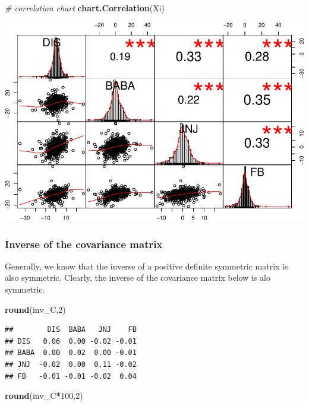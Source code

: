 \documentclass[]{article}
\newenvironment{Shaded}{\begin{snugshade}}{\end{snugshade}}
\newcommand{\KeywordTok}[1]{\textcolor[rgb]{0.13,0.29,0.53}{\textbf{#1}}}
\newcommand{\DecValTok}[1]{\textcolor[rgb]{0.00,0.00,0.81}{#1}}
\newcommand{\CommentTok}[1]{\textcolor[rgb]{0.56,0.35,0.01}{\textit{#1}}}
\newcommand{\OperatorTok}[1]{\textcolor[rgb]{0.81,0.36,0.00}{\textbf{#1}}}
\newcommand{\NormalTok}[1]{#1}
\begin{document}
\begin{Shaded}
\begin{Highlighting}[]
\CommentTok{# correlation chart}
\KeywordTok{chart.Correlation}\NormalTok{(Xi)}
\end{Highlighting}
\end{Shaded}

\includegraphics{Markowitz_Research_Me_files/figure-latex/unnamed-chunk-13-2.pdf}

\subsubsection{Inverse of the covariance
matrix}\label{inverse-of-the-covariance-matrix}

Generally, we know that the inverse of a positive definite symmetric
matrix is also symmetric. Clearly, the inverse of the covariance matrix
below is alo symmetric.

\begin{Shaded}
\begin{Highlighting}[]
\KeywordTok{round}\NormalTok{(inv_C,}\DecValTok{2}\NormalTok{)}
\end{Highlighting}
\end{Shaded}

\begin{verbatim}
##        DIS  BABA   JNJ    FB
## DIS   0.06  0.00 -0.02 -0.01
## BABA  0.00  0.02  0.00 -0.01
## JNJ  -0.02  0.00  0.11 -0.02
## FB   -0.01 -0.01 -0.02  0.04
\end{verbatim}

\begin{Shaded}
\begin{Highlighting}[]
\KeywordTok{round}\NormalTok{(inv_C}\OperatorTok{*}\DecValTok{100}\NormalTok{,}\DecValTok{2}\NormalTok{)}
\end{Highlighting}
\end{Shaded}
\end{document}
